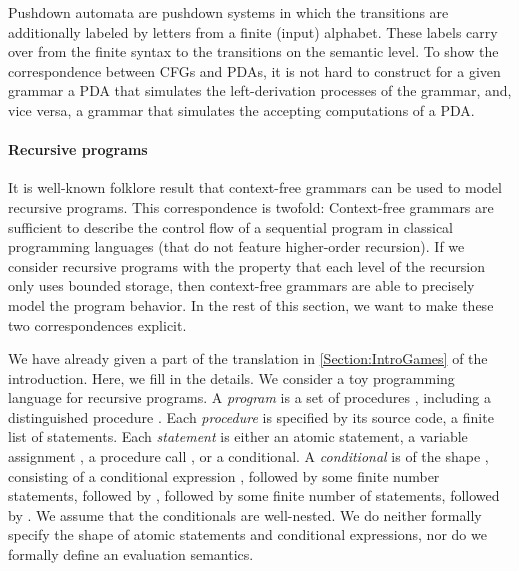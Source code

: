 \documentclass[../../diss.tex]{subfiles}
\begin{document}
Pushdown automata are pushdown systems in which the transitions are additionally labeled by letters from a finite (input) alphabet.
These labels carry over from the finite syntax to the transitions on the semantic level.
To show the correspondence between CFGs and PDAs, it is not hard to construct for a given grammar a PDA that simulates the left-derivation processes of the grammar, and, vice versa, a grammar that simulates the accepting computations of a PDA.\@

\paragraph{Recursive programs}

It is well-known folklore result that context-free grammars can be used to model recursive programs.
This correspondence is twofold:
Context-free grammars are sufficient to describe the control flow of a sequential program in classical programming languages (that do not feature higher-order recursion).
If we consider recursive programs with the property that each level of the recursion only uses bounded storage, then context-free grammars are able to precisely model the program behavior.
In the rest of this section, we want to make these two correspondences explicit.

We have already given a part of the translation in \cref{Section:IntroGames} of the introduction.
Here, we fill in the details.
We consider a toy programming language for recursive programs.
A \emph{program} is a set of procedures , including a distinguished procedure .
Each \emph{procedure} is specified by its source code, a finite list of statements.
Each \emph{statement} is either an atomic statement, \eg a variable assignment , a procedure call , or a conditional.
A \emph{conditional} is of the shape , consisting of a conditional expression , followed by some finite number statements, followed by , followed by some finite number of statements, followed by .
We assume that the conditionals are well-nested.
We do neither formally specify the shape of atomic statements and conditional expressions, nor do we formally define an evaluation semantics.
\end{document}

